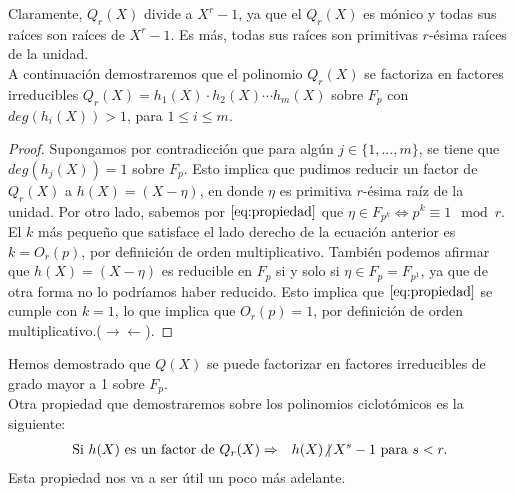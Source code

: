 \documentclass[10pt]{article}
\newcommand{\0}{\mathbf{0}}
\newcommand{\1}{\mathbf{1}}
\newcommand{\nodiv}{\text{$\not|$}\hspace{1.8pt}}
\newcommand{\modl}{\mod}
\newcommand{\+}{\oplus}
\newcommand{\comentario}[1]{}
\newcommand{\comentarioin}[1]{}
\theoremstyle{remark}
\theoremstyle{remark}
\begin{document}
	Claramente, $Q_r(X)$ divide a $X^r -1$, ya que el $Q_r(X)$ es mónico y todas sus raí­ces son raí­ces de $X^r-1$. Es más, todas sus raí­ces son primitivas $r$-ésima raí­ces de la unidad.\\
	A continuación demostraremos que el polinomio $Q_r(X)$ se factoriza en factores irreducibles $Q_r(X)=h_1(X)\cdot h_2(X)\cdots h_m(X)$ sobre $F_p$ con $deg(h_i(X))>1$, para $1\leq i \leq m$. 
	\begin{proof}
		Supongamos por contradicción que para algún $j\in \{1,...,m\}$, se tiene que $deg(h_j(X))=1$ sobre $F_p$. Esto implica que pudimos reducir un factor de $Q_r(X)$ a $h(X) = (X-\eta)$, en donde $\eta$ es primitiva $r$-ésima raí­z de la unidad. Por otro lado, sabemos por $\eqref{eq:propiedad}$ que $\eta \in F_{p^k} \Leftrightarrow p^k\equiv 1 \modl r$.\comentarioin{efectivamente aca solo necesitamos la implicancia de izquierda a derecha y nos ahorramos usar los isomorfismos entre cuerpos finitos} El $k$ más pequeño que satisface el lado derecho de la ecuación anterior es $k = O_r(p)$, por definición de orden multiplicativo. También podemos afirmar que $h(X)=(X-\eta)$ es reducible en $F_p$ si y solo si $\eta\in F_{p}=F_{p^{1}}$, ya que de otra forma no lo podrí­amos haber reducido. Esto implica que $\eqref{eq:propiedad}$ se cumple con $k=1$, lo que implica que $O_r(p)=1$, por definición de orden multiplicativo.($\rightarrow\leftarrow$).
	\end{proof}
	Hemos demostrado que $Q(X)$ se puede factorizar en factores irreducibles de grado mayor a 1 sobre $F_p$.\\
	Otra propiedad que demostraremos sobre los polinomios ciclotómicos es la siguiente:
	\begin{eqnarray}
		\text{Si }h(X)\text{ es un factor de }Q_r(X)&\Rightarrow &h(X)\nodiv X^s-1 \text{ para }s<r.\label{eq:final4.7}
	\end{eqnarray} 
	Esta propiedad nos va a ser útil un poco más adelante.\comentario{en verdad no nos basta esta propiedad para el inicio del lema que viene, pero es bueno saberlo por mientras}	 
\end{document}

